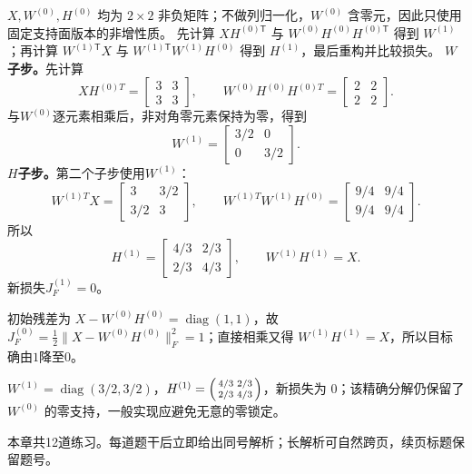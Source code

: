\begin{solution}
\SolGiven $X,W^{(0)},H^{(0)}$ 均为 $2\times2$ 非负矩阵；不做列归一化，$W^{(0)}$ 含零元，因此只使用固定支持面版本的非增性质。
\SolPlan 先计算 $XH^{(0)\mathsf T}$ 与 $W^{(0)}H^{(0)}H^{(0)\mathsf T}$ 得到 $W^{(1)}$；再计算 $W^{(1)\mathsf T}X$ 与 $W^{(1)\mathsf T}W^{(1)}H^{(0)}$ 得到 $H^{(1)}$，最后重构并比较损失。
\SolDerive
\textbf{$W$子步。}先计算
\[
XH^{(0)T}=\begin{bmatrix}3&3\\3&3\end{bmatrix},
\qquad
W^{(0)}H^{(0)}H^{(0)T}
=\begin{bmatrix}2&2\\2&2\end{bmatrix}.
\]
与$W^{(0)}$逐元素相乘后，非对角零元素保持为零，得到
\[
W^{(1)}=\begin{bmatrix}3/2&0\\0&3/2\end{bmatrix}.
\]
\textbf{$H$子步。}第二个子步使用$W^{(1)}$：
\[
W^{(1)T}X=
\begin{bmatrix}3&3/2\\3/2&3\end{bmatrix},
\qquad
W^{(1)T}W^{(1)}H^{(0)}=
\begin{bmatrix}9/4&9/4\\9/4&9/4\end{bmatrix}.
\]
所以
\[
H^{(1)}=\begin{bmatrix}4/3&2/3\\2/3&4/3\end{bmatrix},
\qquad W^{(1)}H^{(1)}=X.
\]
新损失$J_F^{(1)}=0$。

\SolCheck 初始残差为
$X-W^{(0)}H^{(0)}=\operatorname{diag}(1,1)$，故
$J_F^{(0)}=\tfrac12\|X-W^{(0)}H^{(0)}\|_F^2=1$；直接相乘又得
$W^{(1)}H^{(1)}=X$，所以目标确由$1$降至$0$。

\SolAnswer $W^{(1)}=\operatorname{diag}(3/2,3/2)$，$H^{(1)}=\begin{psmallmatrix}4/3&2/3\\2/3&4/3\end{psmallmatrix}$，新损失为 $0$；该精确分解仍保留了 $W^{(0)}$ 的零支持，一般实现应避免无意的零锁定。
\end{solution}

\label{struct:V4-C05-CH34}
\begin{chapterexercisebox}
\label{struct:V4-C05-CH35}
本章共12道练习。每道题干后立即给出同号解析；长解析可自然跨页，续页标题保留题号。
\end{chapterexercisebox}

